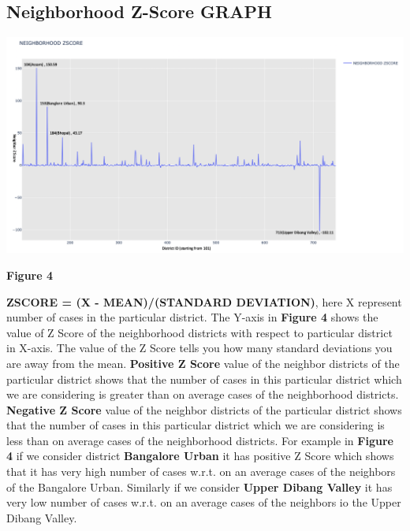 \documentclass{report}
\begin{document}
\newpage 
\subsection{Neighborhood Z-Score GRAPH}
\includegraphics[scale=0.346]{images/Neighbor Z Score.png}
\centerline{\textbf{Figure 4}} \newline\newline
\newline \textbf{ZSCORE = (X - MEAN)/(STANDARD DEVIATION)}, here X represent number of cases in the particular district.
\newline \justify The Y-axis in \textbf{Figure 4} shows the value of Z Score of the neighborhood districts with respect to particular district in X-axis. The value of the Z Score tells you how many standard deviations you are away from the mean. \textbf{Positive Z Score} value of the neighbor districts of the particular district shows that the number of cases in this particular district which we are considering is greater than on average cases of the neighborhood districts. \textbf{Negative Z Score} value of the neighbor districts of the particular district shows that the number of cases in this particular district which we are considering is less than on average cases of the neighborhood districts. 
\newline For example in \textbf{Figure 4} if we consider district \textbf{Bangalore Urban} it has positive Z Score which shows that it has very high number of cases w.r.t. on an average cases of the neighbors of the Bangalore Urban. Similarly if we consider \textbf{Upper Dibang Valley} it has very low number of cases w.r.t. on an average cases of the neighbors io the Upper Dibang Valley.

\newpage 
\end{document}
